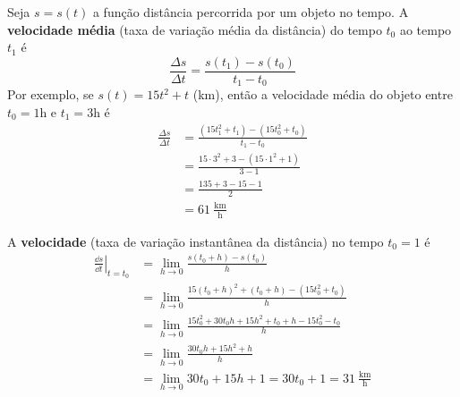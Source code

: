 \cleardoublepage\documentclass[../main.tex]{subfiles}
\begin{document}
\begin{ex}
  Seja $s = s(t)$ a função distância percorrida por um objeto no tempo. A {\bf velocidade média} (taxa de variação média da distância) do tempo $t_0$ ao tempo $t_1$ é
  \begin{equation*}
    \frac{\Delta s}{\Delta t} = \frac{s(t_1)-s(t_0)}{t_1-t_0}
  \end{equation*}
  Por exemplo, se $s(t) = 15t^2+t$ (km), então a velocidade média do objeto entre $t_0=1$h e $t_1=3$h é
  \begin{align*}
    \frac{\Delta s}{\Delta t} &= \frac{(15t_1^2+t_1)-(15t_0^2+t_0)}{t_1-t_0}\\
                              &= \frac{15\cdot 3^2+3-(15\cdot 1^2+1)}{3-1}\\
                              &= \frac{135+3-15-1}{2}\\
                              &= 61~\frac{\text{km}}{\text{h}}
  \end{align*}

  A {\bf velocidade} (taxa de variação instantânea da distância) no tempo $t_0=1$ é
  \begin{align*}
    \left.\frac{\dd s}{\dd t}\right|_{t=t_0} &= \lim_{h\to 0} \frac{s(t_0+h)-s(t_0)}{h} \\
                                             &= \lim_{h\to 0} \frac{15(t_0+h)^2+(t_0+h)-\left(15t_0^2+t_0\right)}{h}\\
                                             &= \lim_{h\to 0} \frac{15t_0^2+30t_0h+15h^2+t_0+h-15t_0^2-t_0}{h}\\
                                             &= \lim_{h\to 0} \frac{30t_0h+15h^2+h}{h}\\
                                             &= \lim_{h\to 0} 30t_0 + 15h + 1= 30t_0+1 = 31~\frac{\text{km}}{\text{h}}
  \end{align*}
\end{ex}
\end{document}
